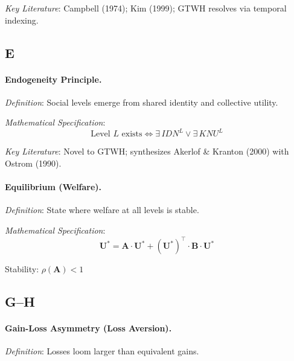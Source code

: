 \textit{Key Literature}: Campbell (1974); Kim (1999); GTWH resolves via temporal indexing.

\subsection*{E}

\paragraph{Endogeneity Principle.}
\textit{Definition}: Social levels emerge from shared identity and collective utility.

\textit{Mathematical Specification}:
\begin{equation}
\boxed{\text{Level } L \text{ exists} \iff \exists \, IDN^L \lor \exists \, KNU^L}
\end{equation}

\textit{Key Literature}: Novel to GTWH; synthesizes Akerlof \& Kranton (2000) 
with Ostrom (1990).

\medskip

\paragraph{Equilibrium (Welfare).}
\textit{Definition}: State where welfare at all levels is stable.

\textit{Mathematical Specification}:
\begin{equation}
\mathbf{U}^* = \mathbf{A} \cdot \mathbf{U}^* + (\mathbf{U}^*)^\top \cdot \mathbf{B} \cdot \mathbf{U}^*
\end{equation}

Stability: $\rho(\mathbf{A}) < 1$

\subsection*{G--H}

\paragraph{Gain-Loss Asymmetry (Loss Aversion).}
\textit{Definition}: Losses loom larger than equivalent gains.

